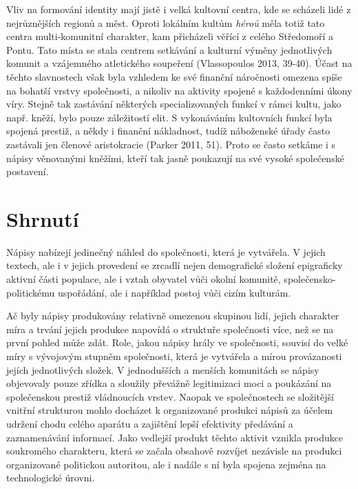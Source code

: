 Vliv na formování identity mají jistě i velká kultovní centra, kde se scházeli lidé z nejrůznějších regionů a měst. Oproti lokálním kultům {\em héroů} měla totiž tato centra multi-komunitní charakter, kam přicházeli věřící z celého Středomoří a Pontu. Tato místa se stala centrem setkávání a kulturní výměny jednotlivých komunit a vzájemného atletického soupeření (Vlassopoulos 2013, 39-40). Účast na těchto slavnostech však byla vzhledem ke své finanční náročnosti omezena spíše na bohatší vrstvy společnosti, a nikoliv na aktivity spojené s každodenními úkony víry. Stejně tak zastávání některých specializovaných funkcí v rámci kultu, jako např. kněží, bylo pouze záležitostí elit. S vykonáváním kultovních funkcí byla spojená prestiž, a někdy i finanční nákladnost, tudíž náboženské úřady často zastávali jen členové aristokracie (Parker 2011, 51). Proto se často setkáme i s nápisy věnovanými kněžími, kteří tak jasně poukazují na své vysoké společenské postavení.

\section[shrnutí]{Shrnutí}

Nápisy nabízejí jedinečný náhled do společnosti, která je vytvářela. V jejich textech, ale i v jejich provedení se zrcadlí nejen demografické složení epigraficky aktivní části populace, ale i vztah obyvatel vůči okolní komunitě, společensko-politickému uspořádání, ale i například postoj vůči cizím kulturám.

Ač byly nápisy produkovány relativně omezenou skupinou lidí, jejich charakter míra a trvání jejich produkce napovídá o struktuře společnosti více, než se na první pohled může zdát. Role, jakou nápisy hrály ve společnosti, souvisí do velké míry s vývojovým stupněm společnosti, která je vytvářela a mírou provázanosti jejích jednotlivých složek. V jednodušších a menších komunitách se nápisy objevovaly pouze zřídka a sloužily převážně legitimizaci moci a poukázání na společenskou prestiž vládnoucích vrstev. Naopak ve společnostech se složitější vnitřní strukturou mohlo docházet k organizované produkci nápisů za účelem udržení chodu celého aparátu a zajištění lepší efektivity předávání a zaznamenávání informací. Jako vedlejší produkt těchto aktivit vznikla produkce soukromého charakteru, která se začala obsahově rozvíjet nezávisle na produkci organizované politickou autoritou, ale i nadále s ní byla spojena zejména na technologické úrovni.

